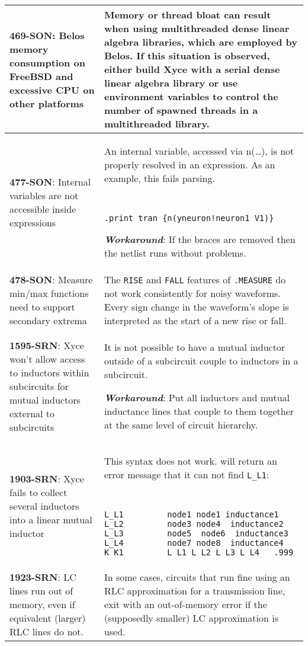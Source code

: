 \begin{longtable}[h] {>{\raggedright\small}m{2in}|>{\raggedright\let\\\tabularnewline\small}m{3.5in}}
\textbf{469-SON}: Belos memory consumption on FreeBSD and excessive CPU on other
platforms &
Memory or thread bloat can result when using multithreaded dense linear algebra
libraries, which are employed by Belos.  If this situation is observed, either build
Xyce with a serial dense linear algebra library or use environment variables to control
the number of spawned threads in a multithreaded library.
\\ \hline


\textbf{477-SON}: Internal variables are not accessible inside expressions &
An internal variable, accessed via n(…), is not properly resolved in an
expression. As an example, this fails parsing. 
{\tt
\begin{verbatim}
.print tran {n(yneuron!neuron1_V1)} 
\end{verbatim}
}
\textbf{\textit{Workaround}}: If the braces are removed then the netlist
runs without problems.
\\ \hline


\textbf{478-SON}: Measure min/max functions need to support secondary extrema &
The \texttt{RISE} and \texttt{FALL} features of \texttt{.MEASURE} do not work
consistently for noisy waveforms. Every sign change in the waveform’s slope
is interpreted as the start of a new rise or fall.
\\ \hline


\textbf{1595-SRN}: Xyce won't allow access to inductors within subcircuits for
mutual inductors external to subcircuits & It is not possible to have a mutual
inductor outside of a subcircuit couple to inductors in a subcircuit.

\textbf{\textit{Workaround}}: Put all inductors and mutual inductance lines that couple to
them together at the same level of circuit hierarchy.
\\ \hline


\textbf{1903-SRN}: Xyce fails to collect several inductors into a linear mutual inductor &
This syntax does not work. \Xyce{} will return an error message that it can not find 
\texttt{L\_L1}:
{\tt
\begin{verbatim}
L_L1         node1 node1 inductance1
L_L2         node3 node4  inductance2
L_L3         node5  node6  inductance3
L_L4         node7 node8  inductance4
K_K1         L_L1 L_L2 L_L3 L_L4   .999 
\end{verbatim}
}
 
\\ \hline


\textbf{1923-SRN}: LC lines run out of memory, even if equivalent (larger) RLC
lines do not. &  In some cases, circuits that run fine using an RLC approximation for a
transmission line, exit with an out-of-memory error if the (supposedly smaller) LC
approximation is used.
\\ \hline

\end{longtable}

